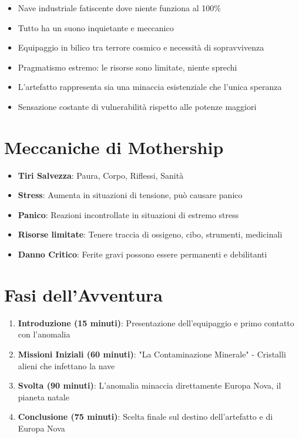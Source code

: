 \documentclass[11pt,a4paper]{article}
\begin{document}
\begin{tcolorbox}[colback=mininglightorange!10, colframe=miningorange]
\begin{itemize}[leftmargin=*]
\item Nave industriale fatiscente dove niente funziona al 100\%
\item Tutto ha un suono inquietante e meccanico
\item Equipaggio in bilico tra terrore cosmico e necessità di sopravvivenza
\item Pragmatismo estremo: le risorse sono limitate, niente sprechi
\item L'artefatto rappresenta sia una minaccia esistenziale che l'unica speranza
\item Sensazione costante di vulnerabilità rispetto alle potenze maggiori
\end{itemize}
\end{tcolorbox}

\section{Meccaniche di Mothership}

\begin{tcolorbox}[colback=mininglightorange!10, colframe=miningorange]
\begin{itemize}[leftmargin=*]
\item \textbf{Tiri Salvezza}: Paura, Corpo, Riflessi, Sanità
\item \textbf{Stress}: Aumenta in situazioni di tensione, può causare panico
\item \textbf{Panico}: Reazioni incontrollate in situazioni di estremo stress
\item \textbf{Risorse limitate}: Tenere traccia di ossigeno, cibo, strumenti, medicinali
\item \textbf{Danno Critico}: Ferite gravi possono essere permanenti e debilitanti
\end{itemize}
\end{tcolorbox}

\section{Fasi dell'Avventura}

\begin{tcolorbox}[colback=mininglightorange!10, colframe=miningorange]
\begin{enumerate}[leftmargin=*]
\item \textbf{Introduzione (15 minuti)}: Presentazione dell'equipaggio e primo contatto con l'anomalia
\item \textbf{Missioni Iniziali (60 minuti)}: "La Contaminazione Minerale" - Cristalli alieni che infettano la nave
\item \textbf{Svolta (90 minuti)}: L'anomalia minaccia direttamente Europa Nova, il pianeta natale
\item \textbf{Conclusione (75 minuti)}: Scelta finale sul destino dell'artefatto e di Europa Nova
\end{enumerate}
\end{tcolorbox}
\end{document}
